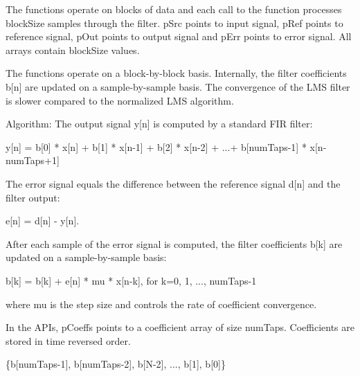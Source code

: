 The functions operate on blocks of data and each call to the function processes {\ttfamily block\-Size} samples through the filter. {\ttfamily p\-Src} points to input signal, {\ttfamily p\-Ref} points to reference signal, {\ttfamily p\-Out} points to output signal and {\ttfamily p\-Err} points to error signal. All arrays contain {\ttfamily block\-Size} values.

The functions operate on a block-\/by-\/block basis. Internally, the filter coefficients {\ttfamily b\mbox{[}n\mbox{]}} are updated on a sample-\/by-\/sample basis. The convergence of the L\-M\-S filter is slower compared to the normalized L\-M\-S algorithm.

\begin{DoxyParagraph}{Algorithm\-: }
The output signal {\ttfamily y\mbox{[}n\mbox{]}} is computed by a standard F\-I\-R filter\-: 
\begin{DoxyPre}   
     y[n] = b[0] * x[n] + b[1] * x[n-1] + b[2] * x[n-2] + ...+ b[numTaps-1] * x[n-numTaps+1]   
 \end{DoxyPre}

\end{DoxyParagraph}
\begin{DoxyParagraph}{}
The error signal equals the difference between the reference signal {\ttfamily d\mbox{[}n\mbox{]}} and the filter output\-: 
\begin{DoxyPre}   
     e[n] = d[n] - y[n].   
 \end{DoxyPre}

\end{DoxyParagraph}
\begin{DoxyParagraph}{}
After each sample of the error signal is computed, the filter coefficients {\ttfamily b\mbox{[}k\mbox{]}} are updated on a sample-\/by-\/sample basis\-: 
\begin{DoxyPre}   
     b[k] = b[k] + e[n] * mu * x[n-k],  for k=0, 1, ..., numTaps-1   
 \end{DoxyPre}
 where {\ttfamily mu} is the step size and controls the rate of coefficient convergence. 
\end{DoxyParagraph}
\begin{DoxyParagraph}{}
In the A\-P\-Is, {\ttfamily p\-Coeffs} points to a coefficient array of size {\ttfamily num\-Taps}. Coefficients are stored in time reversed order. 
\end{DoxyParagraph}
\begin{DoxyParagraph}{}

\begin{DoxyPre}   
    \{b[numTaps-1], b[numTaps-2], b[N-2], ..., b[1], b[0]\}   
 \end{DoxyPre}
 
\end{DoxyParagraph}
